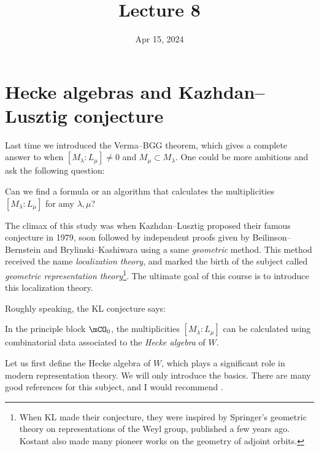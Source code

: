 





\title{Lecture 8}

\date{Apr 15, 2024}

\maketitle



\section{Hecke algebras and Kazhdan--Lusztig conjecture}

	Last time we introduced the Verma--BGG theorem, which gives a complete answer to when $[M_\lambda:L_\mu]\neq 0$ and $M_\mu\subset M_\lambda$. One could be more ambitious and ask the following question:

\begin{ques}
	Can we find a formula or an algorithm that calculates the multiplicities $[M_\lambda:L_\mu]$ for amy $\lambda,\mu$?
\end{ques}

	The climax of this study was when Kazhdan--Lusztig proposed their famous conjecture in 1979, soon followed by independent proofs given by Beilinson--Bernstein and Brylinski--Kashiwara using a same \emph{geometric} method. This method received the name \emph{localization theory}, and marked the birth of the subject called \emph{geometric representation theory}\footnote{When KL made their conjecture, they were inspired by Springer's geometric theory on representations of the Weyl group, published a few years ago. Kostant also made many pioneer works on the geometry of adjoint orbits.}. The ultimate goal of this course is to introduce this localization theory.

	Roughly speaking, the KL conjecture says:

\begin{conje}
	In the principle block $\mCO_{0}$, the multiplicities $[M_\lambda:L_\mu]$ can be calculated using combinatorial data associated to the \emph{Hecke algebra} of $W$.
\end{conje}

	Let us first define the Hecke algebra of $W$, which plays a significant role in modern representation theory. We will only introduce the basics. There are many good references for this subject, and I would recommend \cite[Sect. 3]{EMTW}.


